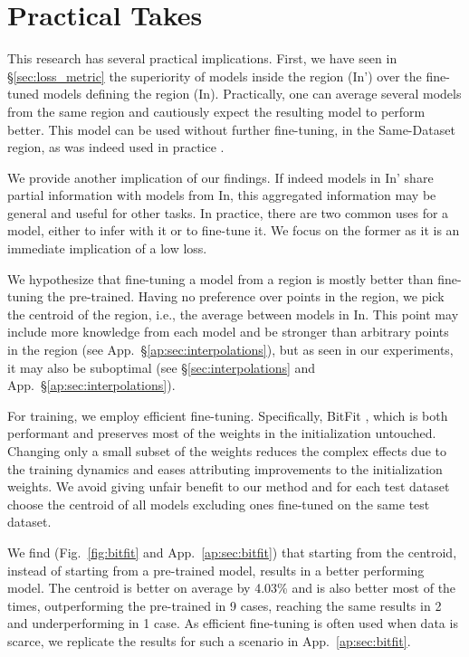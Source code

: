 \documentclass[nohyperref]{article}
\theoremstyle{plain}
\theoremstyle{definition}
\theoremstyle{remark}
\begin{document}
\section{Practical Takes}\label{sec:practical} 
This research has several practical implications. First, we have seen in \S\ref{sec:loss_metric} the superiority of models inside the region (In') over the fine-tuned models defining the region (In). Practically, one can average several models from the same region and cautiously expect the resulting model to perform better. This model can be used without further fine-tuning, in the Same-Dataset region, as was indeed used in practice \citep[c.f. \S\ref{sec:related};][]{Wortsman2022ModelSA,wortsman2022fi}. 

We provide another implication of our findings. If indeed models in In' share partial information with models from In, this aggregated information may be general and useful for other tasks. In practice, there are two common uses for a model, either to infer with it or to fine-tune it.
We focus on the former as it is an immediate implication of a low loss.

We hypothesize that fine-tuning a model from a region is mostly better than fine-tuning the pre-trained. Having no preference over points in the region, we pick the centroid of the region, i.e., the average between models in In. This point may include more knowledge from each model and be stronger than arbitrary points in the region (see App.~\S\ref{ap:sec:interpolations}), but as seen in our experiments, it may also be suboptimal (see \S\ref{sec:interpolations} and App.~\S\ref{ap:sec:interpolations}).

For training, we employ efficient fine-tuning. Specifically, BitFit \citep{ben-zaken-etal-2022-bitfit}, which is both performant and preserves most of the weights in the initialization untouched. Changing only a small subset of the weights reduces the complex effects due to the training dynamics and eases attributing improvements to the initialization weights. We avoid giving unfair benefit to our method and for each test dataset choose the centroid of all models excluding ones fine-tuned on the same test dataset. 

We find (Fig.~\ref{fig:bitfit} and App.~\ref{ap:sec:bitfit}) that starting from the centroid, instead of starting from a pre-trained model, results in a better performing model. The centroid is better on average by 4.03\% and is also better most of the times, outperforming the pre-trained in 9 cases, reaching the same results in 2 and underperforming in 1 case. As efficient fine-tuning is often used when data is scarce, we replicate the results for such a scenario in App.~\ref{ap:sec:bitfit}. 
\end{document}
